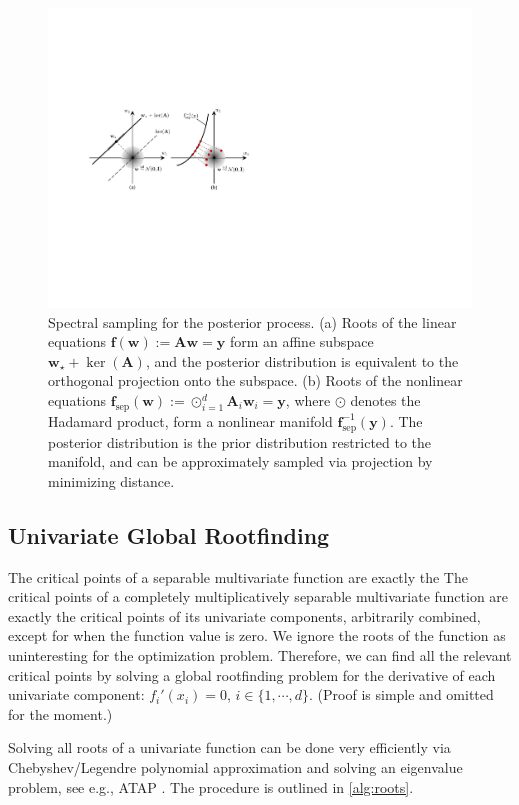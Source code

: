 \documentclass{article}
\newcommand{\edit}[1]{\textcolor{blue!80!black}{#1}} %
\begin{document}
\begin{figure}[t]
  \centering
  \includegraphics[width=0.75\linewidth]{img/projection.pdf}
  \caption{Spectral sampling for the posterior process.
    (a) Roots of the linear equations $\mathbf{f}(\mathbf{w}) := \mathbf{A} \mathbf{w} = \mathbf{y}$
    form an affine subspace $\mathbf{w}_\star + \ker(\mathbf{A})$,
    and the posterior distribution is equivalent to the orthogonal projection onto the subspace.
    (b) Roots of the nonlinear equations $\mathbf{f}_{\mathrm{sep}}(\mathbf{w}) :=
    \odot_{i=1}^d \mathbf{A}_i \mathbf{w}_i = \mathbf{y}$, where $\odot$ denotes the Hadamard product,
    form a nonlinear manifold $\mathbf{f}_{\mathrm{sep}}^{-1}(\mathbf{y})$.
    The posterior distribution is the prior distribution restricted to the manifold,
    and can be approximately sampled via projection by minimizing distance.}
  \label{fig:projection}
\end{figure}

\subsection{Univariate Global Rootfinding}

The critical points of a separable multivariate function are exactly the
The critical points of a \edit{completely multiplicatively} separable multivariate function are exactly the
critical points of its univariate components, arbitrarily combined,
except for when the function value is zero. We ignore the roots of the
function as uninteresting for the optimization problem. Therefore, we
can find all the relevant critical points by solving a global
rootfinding problem for the derivative of each univariate component:
$f_i'(x_i) = 0$, $i \in \{1, \cdots, d\}$. (Proof is simple and
omitted for the moment.)

Solving all roots of a univariate function can be done very efficiently
via Chebyshev/Legendre polynomial approximation and solving an
eigenvalue problem, see e.g., ATAP \cite{Trefethen2019}. The procedure
is outlined in \cref{alg:roots}.
\end{document}
